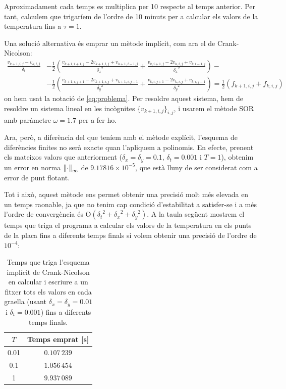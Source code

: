\documentclass[10pt,a4paper]{article}
\renewcommand{\O}[1]{\mathrm{O}\left(#1\right)} %
\theoremstyle{definition}
\theoremstyle{remark}
\begin{document}
Aproximadament cada temps es multiplica per 10 respecte al temps anterior. Per tant, calculem que trigaríem de l'ordre de 10 minuts per a calcular els valors de la temperatura fins a $\tau=1$.\vspace{0.25cm}

Una solució alternativa és emprar un mètode implícit, com ara el de Crank-Nicolson:
\begin{align*}
  \frac{v_{k+1,i,j}-v_{k,i,j}}{\delta_t} & - \frac{1}{2}\left(\frac{v_{k+1,i+1,j}-2v_{k+1,i,j}+v_{k+1,i-1,j}}{{\delta_x}^2} +\frac{v_{k,i+1,j}-2v_{k,i,j}+v_{k,i-1,j}}{{\delta_x}^2} \right)  -                                             \\
                                         & -\frac{1}{2}\left( \frac{v_{k+1,i,j+1}-2v_{k+1,i,j}+v_{k+1,i,j-1}}{{\delta_y}^2}+ \frac{v_{k,i,j+1}-2v_{k,i,j}+v_{k,i,j-1}}{{\delta_y}^2}\right) = \frac{1}{2}\left(f_{k+1,i,j}+f_{k,i,j}\right)
\end{align*}
on hem usat la notació de \eqref{eq:problema}. Per resoldre aquest sistema, hem de resoldre un sistema lineal en les incògnites $\{v_{k+1,i,j}\}_{i,j}$, i usarem el mètode SOR amb paràmetre $\omega = 1.7$ per a fer-ho.

Ara, però, a diferència del que teníem amb el mètode explícit, l'esquema de diferències finites no serà exacte quan l'apliquem a polinomis. En efecte, prenent els mateixos valors que anteriorment ($\delta_x=\delta_y=0.1$, $\delta_t=0.001$ i $T=1$), obtenim un error en norma $\norm{\cdot}_\infty$ de $9.17816\times 10^{-5}$, que està lluny de ser considerat com a error de punt flotant.

Tot i això, aquest mètode ens permet obtenir una precisió molt més elevada en un temps raonable, ja que no tenim cap condició d'estabilitat a satisfer-se i a més l'ordre de convergència és $\O{{\delta_t}^2 + {\delta_x}^2 + {\delta_y}^2}$. A la taula següent mostrem el temps que triga el programa a calcular els valors de la temperatura en els punts de la placa fins a diferents temps finals si volem obtenir una precisió de l'ordre de $10^{-4}$:
\begin{table}[ht]
  \centering
  \begin{tabular}{|c|c|}
    \hline
    $T$  & Temps emprat [s] \\ \hline\hline
    0.01 & $0.107\,239$     \\
    0.1  & $1.056\,454$     \\
    1    & $9.937\,089$     \\
    \hline
  \end{tabular}
  \caption{Temps que triga l'esquema implícit de Crank-Nicolson en calcular i escriure a un fitxer tots els valors en cada graella (usant $\delta_x= \delta_y=0.01$ i $\delta_t=0.001$) fins a diferents temps finals.}
\end{table}
\end{document}
